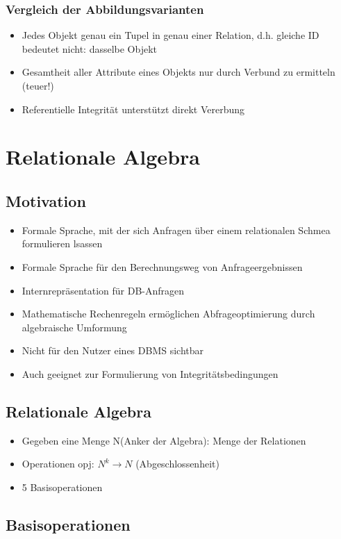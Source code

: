 \subsubsection{Vergleich der Abbildungsvarianten}
\begin{itemize}
	\item Jedes Objekt genau ein Tupel in genau einer Relation, d.h. gleiche ID bedeutet nicht: dasselbe Objekt
	\item Gesamtheit aller Attribute eines Objekts nur durch  Verbund zu ermitteln (teuer!)
	\item Referentielle Integrität unterstützt direkt Vererbung
\end{itemize}

\section{Relationale Algebra}
\subsection{Motivation}
\begin{itemize}
	\item Formale Sprache, mit der sich Anfragen über einem relationalen Schmea formulieren lsassen
	\item Formale Sprache für den Berechnungsweg von Anfrageergebnissen
	\item Internrepräsentation für DB-Anfragen
	\item Mathematische Rechenregeln ermöglichen Abfrageoptimierung durch algebraische Umformung
	\item Nicht für den Nutzer eines DBMS sichtbar
	\item Auch geeignet zur Formulierung von Integritätsbedingungen	
\end{itemize}
\subsection{Relationale Algebra}
\begin{itemize}
	\item Gegeben eine Menge N(Anker der Algebra): Menge der Relationen
	\item Operationen opj: \(N^k\to N\) (Abgeschlossenheit)
	\item 5 Basisoperationen
\end{itemize}
\subsection{Basisoperationen}
